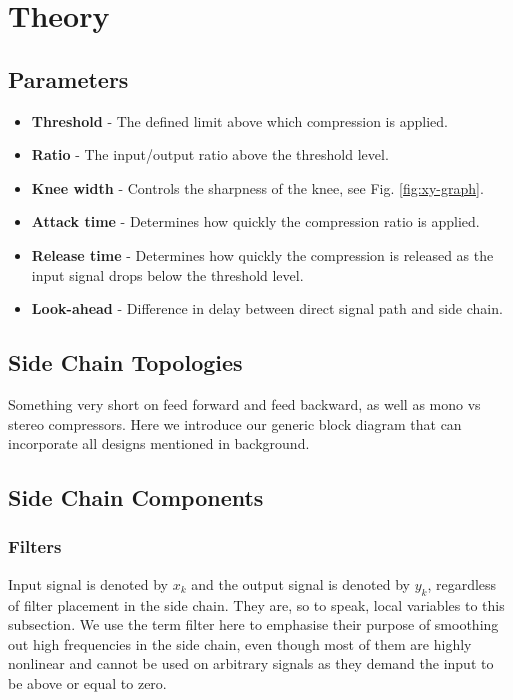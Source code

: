 \documentclass[../main2.tex]{subfiles}
\begin{document}
\section{Theory}\label{sec_theory}

\subsection{Parameters}

\begin{itemize}
\item \textbf{Threshold} - The defined limit above which compression is applied.
\item \textbf{Ratio} - The input/output ratio above the threshold level.
\item \textbf{Knee width} - Controls the sharpness of the knee, see Fig. \ref{fig:xy-graph}.
\item \textbf{Attack time} - Determines how quickly the compression ratio is applied.
\item \textbf{Release time} - Determines how quickly the compression is released as the input signal drops below the threshold level.
\item \textbf{Look-ahead} - Difference in delay between direct signal path and side chain. 

\end{itemize}

\subsection{Side Chain Topologies}
Something very short on feed forward and feed backward, as well as mono vs stereo compressors.
Here we introduce our generic block diagram that can incorporate all designs mentioned in background.

\subsection{Side Chain Components}

\subsubsection{Filters}
Input signal is denoted by $x_k$ and the output signal is denoted by $y_k$, regardless of filter placement in the side chain. They are, so to speak, local variables to this subsection. We use the term filter here to emphasise their purpose of smoothing out high frequencies in the side chain, even though most of them are highly nonlinear and cannot be used on arbitrary signals as they demand the input to be above or equal to zero.
\end{document}
